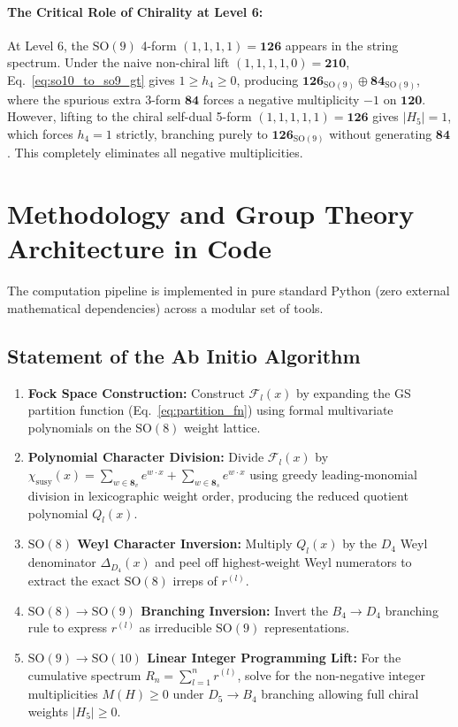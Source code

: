 \documentclass[11pt,a4paper]{article}
\begin{document}
\paragraph{The Critical Role of Chirality at Level 6:} At Level 6, the $\mathrm{SO}(9)$ 4-form $(1,1,1,1) = \mathbf{126}$ appears in the string spectrum. Under the naive non-chiral lift $(1,1,1,1,0) = \mathbf{210}$, Eq.~\eqref{eq:so10_to_so9_gt} gives $1 \ge h_4 \ge 0$, producing $\mathbf{126}_{\mathrm{SO}(9)} \oplus \mathbf{84}_{\mathrm{SO}(9)}$, where the spurious extra 3-form $\mathbf{84}$ forces a negative multiplicity $-1$ on $\mathbf{120}$. However, lifting to the chiral self-dual 5-form $(1,1,1,1,1) = \mathbf{126}$ gives $|H_5| = 1$, which forces $h_4 = 1$ strictly, branching purely to $\mathbf{126}_{\mathrm{SO}(9)}$ without generating $\mathbf{84}$. This completely eliminates all negative multiplicities.

\section{Methodology and Group Theory Architecture in Code}
\label{sec:methodology}
The computation pipeline is implemented in pure standard Python (zero external mathematical dependencies) across a modular set of tools.

\subsection{Statement of the Ab Initio Algorithm}
\begin{enumerate}
    \item \textbf{Fock Space Construction:} Construct $\mathcal{F}_l(x)$ by expanding the GS partition function (Eq.~\eqref{eq:partition_fn}) using formal multivariate polynomials on the $\mathrm{SO}(8)$ weight lattice.
    \item \textbf{Polynomial Character Division:} Divide $\mathcal{F}_l(x)$ by $\chi_{\text{susy}}(x) = \sum_{w \in \mathbf{8}_v} e^{w \cdot x} + \sum_{w \in \mathbf{8}_s} e^{w \cdot x}$ using greedy leading-monomial division in lexicographic weight order, producing the reduced quotient polynomial $Q_l(x)$.
    \item \textbf{$\mathrm{SO}(8)$ Weyl Character Inversion:} Multiply $Q_l(x)$ by the $D_4$ Weyl denominator $\Delta_{D_4}(x)$ and peel off highest-weight Weyl numerators to extract the exact $\mathrm{SO}(8)$ irreps of $r^{(l)}$.
    \item \textbf{$\mathrm{SO}(8) \to \mathrm{SO}(9)$ Branching Inversion:} Invert the $B_4 \to D_4$ branching rule to express $r^{(l)}$ as irreducible $\mathrm{SO}(9)$ representations.
    \item \textbf{$\mathrm{SO}(9) \to \mathrm{SO}(10)$ Linear Integer Programming Lift:} For the cumulative spectrum $R_n = \sum_{l=1}^n r^{(l)}$, solve for the non-negative integer multiplicities $M(H) \ge 0$ under $D_5 \to B_4$ branching allowing full chiral weights $|H_5| \ge 0$.
\end{enumerate}
\end{document}
